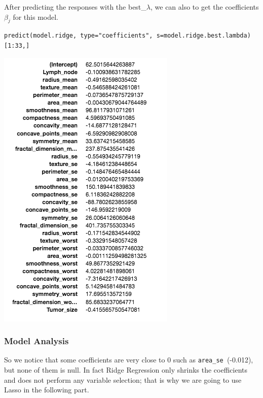 \documentclass[]{report}
\begin{document}
After predicting the responses with the best\_$\lambda$,  we can also to get the coefficients $\beta_{j}$ for this model.

\begin{lstlisting}
predict(model.ridge, type="coefficients", s=model.ridge.best.lambda)[1:33,]
\end{lstlisting}

\begin{center}
	\includegraphics[width=0.8\linewidth]{Figures/ridge_coeff}
\end{center}

\subsubsection{Model Analysis}
So we notice that some coefficients are very close to 0 such as \texttt{area\_se }(-0.012), but none of them is null. In fact Ridge Regression only shrinks the coefficients and does not perform any variable selection;  that is why we are going to use Lasso in the following part.
\end{document}
